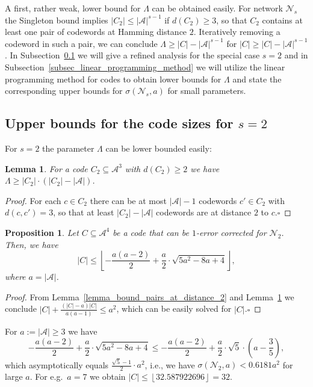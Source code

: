 \documentclass[11pt]{article}
\newcommand{\cA}{\mathcal{A}}
\newcommand{\cN}{\mathcal{N}}
\newtheorem{proposition}[theorem]{Proposition}
\newtheorem{lemma}[theorem]{Lemma}
\begin{document}
A first, rather weak, lower bound for $\Lambda$ can be obtained easily. For network $\cN_s$ the Singleton bound implies $|C_2|\le |\cA|^{s-1}$ if 
$d(C_2)\ge 3$, so that $C_2$ contains at least one pair of codewords at Hamming distance $2$. Iteratively removing a codeword in such a pair, we 
can conclude $\Lambda\ge |C|-|\cA|^{s-1}$ for $|C|\ge|C|-|\cA|^{s-1}$. In Subsection~\ref{subsec_lambda_bound_s_2} we will give a refined analysis 
for the special case $s=2$ and in Subsection~\ref{subsec_linear_programming_method} we will utilize the linear programming method for codes to 
obtain lower bounds for $\Lambda$ and state the corresponding upper bounds for $\sigma(\cN_s,a)$ for small parameters.  

\subsection{Upper bounds for the code sizes for $s=2$}
\label{subsec_lambda_bound_s_2}
For $s=2$ the parameter $\Lambda$  %
can be lower bounded easily:
\begin{lemma}
  \label{lemma_length_3_lb_pairs_at_distance_2}
  For a code $C_2\subseteq \cA^3$ with $d(C_2)\ge 2$ we have $\Lambda\ge |C_2|\cdot(|C_2|-|\cA|)$.
\end{lemma}
\begin{proof}
  For each $c\in C_2$ there can be at most $|\cA|-1$ codewords $c'\in C_2$ with $d(c,c')=3$, so that at least $|C_2|-|\cA|$ codewords 
  are at distance $2$ to $c$.\hfill{$\square$}
\end{proof}

\begin{proposition}
  \label{}
  Let $C\subseteq \cA^{4}$ be a code that can be $1$-error corrected for $\cN_2$. Then, we have
  \begin{equation}
    |C| \le \left\lfloor -\frac{a(a-2)}{2}+\frac{a}{2}\cdot \sqrt{5a^2-8a +4}\right\rfloor,
  \end{equation}
  where $a=|\cA|$.  
\end{proposition}
\begin{proof}
  From Lemma~\ref{lemma_bound_pairs_at_distance_2} and Lemma~\ref{lemma_length_3_lb_pairs_at_distance_2} we conclude $|C| +\frac{(|C|-a)|C|}{a(a-1)} \le a^2$, 
  which can be easily solved for $|C|$.\hfill{$\square$}  
\end{proof}
For $a:=|\cA|\ge 3$ we have 
$$
  -\frac{a(a-2)}{2}+\frac{a}{2}\cdot \sqrt{5a^2-8a +4} \le -\frac{a(a-2)}{2} +\frac{a}{2}\cdot\sqrt{5} \cdot\left(a-\frac{3}{5}\right),
$$
which asymptotically equals $\frac{\sqrt{5}-1}{2}\cdot a^2$, i.e., we have $\sigma(\cN_2,a)<0.6181a^2$ for large $a$. For e.g.\ $a=7$ we obtain $|C|\le \left\lfloor 32.587922696\right\rfloor=32$.
\end{document}
